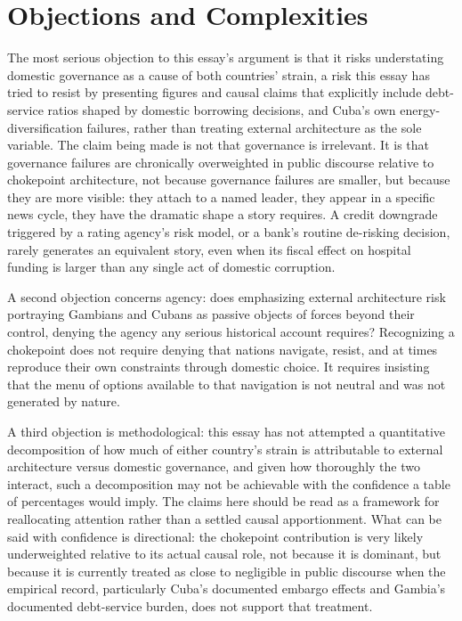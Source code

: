 \documentclass[11pt]{article}
\begin{document}
\section{Objections and Complexities}

The most serious objection to this essay's argument is that it risks understating domestic governance as a cause of both countries' strain, a risk this essay has tried to resist by presenting figures and causal claims that explicitly include debt-service ratios shaped by domestic borrowing decisions, and Cuba's own energy-diversification failures, rather than treating external architecture as the sole variable. The claim being made is not that governance is irrelevant. It is that governance failures are chronically overweighted in public discourse relative to chokepoint architecture, not because governance failures are smaller, but because they are more visible: they attach to a named leader, they appear in a specific news cycle, they have the dramatic shape a story requires. A credit downgrade triggered by a rating agency's risk model, or a bank's routine de-risking decision, rarely generates an equivalent story, even when its fiscal effect on hospital funding is larger than any single act of domestic corruption.

A second objection concerns agency: does emphasizing external architecture risk portraying Gambians and Cubans as passive objects of forces beyond their control, denying the agency any serious historical account requires? Recognizing a chokepoint does not require denying that nations navigate, resist, and at times reproduce their own constraints through domestic choice. It requires insisting that the menu of options available to that navigation is not neutral and was not generated by nature.

A third objection is methodological: this essay has not attempted a quantitative decomposition of how much of either country's strain is attributable to external architecture versus domestic governance, and given how thoroughly the two interact, such a decomposition may not be achievable with the confidence a table of percentages would imply. The claims here should be read as a framework for reallocating attention rather than a settled causal apportionment. What can be said with confidence is directional: the chokepoint contribution is very likely underweighted relative to its actual causal role, not because it is dominant, but because it is currently treated as close to negligible in public discourse when the empirical record, particularly Cuba's documented embargo effects and Gambia's documented debt-service burden, does not support that treatment.
\end{document}
